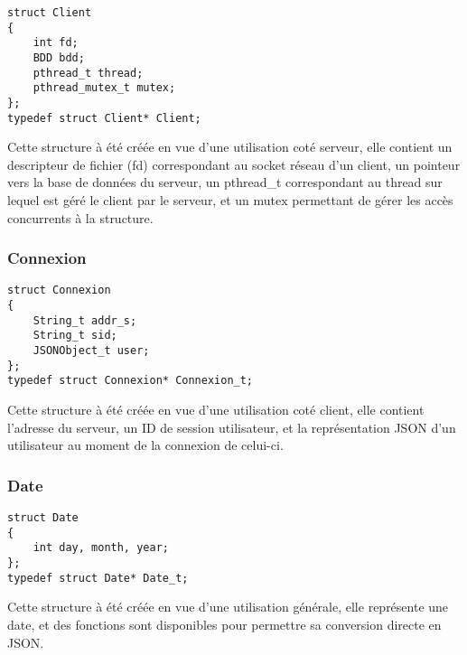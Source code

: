 \begin{lstlisting}
struct Client
{
	int fd;
	BDD bdd;
	pthread_t thread;
	pthread_mutex_t mutex;
};
typedef struct Client* Client;
\end{lstlisting}
Cette structure à été créée en vue d'une utilisation coté serveur, elle contient un descripteur de fichier (fd) correspondant au socket réseau d'un client, un pointeur vers la base de données du serveur, un pthread\_t correspondant au thread sur lequel est géré le client par le serveur, et un mutex permettant de gérer les accès concurrents à la structure.
\subsubsection{Connexion}

\begin{lstlisting}
struct Connexion
{
	String_t addr_s;
	String_t sid;
	JSONObject_t user;
};
typedef struct Connexion* Connexion_t;
\end{lstlisting}
Cette structure à été créée en vue d'une utilisation coté client, elle contient l'adresse du serveur, un ID de session utilisateur, et la représentation JSON d'un utilisateur au moment de la connexion de celui-ci.
\subsubsection{Date}
\begin{lstlisting}
struct Date
{
	int day, month, year;
};
typedef struct Date* Date_t;
\end{lstlisting}
Cette structure à été créée en vue d'une utilisation générale, elle représente une date, et des fonctions sont disponibles pour permettre sa conversion directe en JSON.


% 
